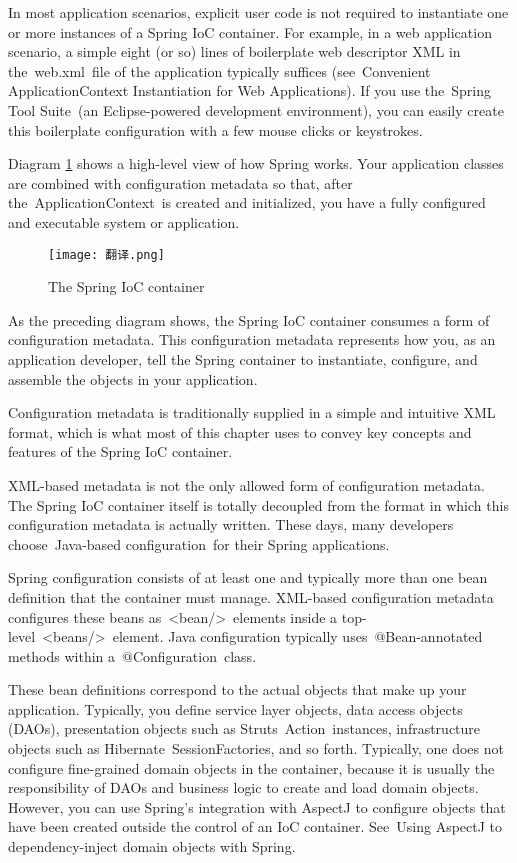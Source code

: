 In most application scenarios, explicit user code is not required to instantiate one or more instances of a Spring IoC container. For example, in a web application scenario, a simple eight (or so) lines of boilerplate web descriptor XML in the web.xml file of the application typically suffices (see Convenient ApplicationContext Instantiation for Web Applications). If you use the Spring Tool Suite (an Eclipse-powered development environment), you can easily create this boilerplate configuration with a few mouse clicks or keystrokes.

Diagram \ref{fig:spring-di-en} shows a high-level view of how Spring works. Your application classes are combined with configuration metadata so that, after the ApplicationContext is created and initialized, you have a fully configured and executable system or application.

\begin{figure}[!ht]
  \centering
  \texttt{[image: 翻译.png]}
  \caption{The Spring IoC container}
  \label{fig:spring-di-en}
\end{figure}

As the preceding diagram shows, the Spring IoC container consumes a form of configuration metadata. This configuration metadata represents how you, as an application developer, tell the Spring container to instantiate, configure, and assemble the objects in your application.

Configuration metadata is traditionally supplied in a simple and intuitive XML format, which is what most of this chapter uses to convey key concepts and features of the Spring IoC container.

XML-based metadata is not the only allowed form of configuration metadata. The Spring IoC container itself is totally decoupled from the format in which this configuration metadata is actually written. These days, many developers choose Java-based configuration for their Spring applications.

Spring configuration consists of at least one and typically more than one bean definition that the container must manage. XML-based configuration metadata configures these beans as <bean/> elements inside a top-level <beans/> element. Java configuration typically uses @Bean-annotated methods within a @Configuration class.

These bean definitions correspond to the actual objects that make up your application. Typically, you define service layer objects, data access objects (DAOs), presentation objects such as Struts Action instances, infrastructure objects such as Hibernate SessionFactories, and so forth. Typically, one does not configure fine-grained domain objects in the container, because it is usually the responsibility of DAOs and business logic to create and load domain objects. However, you can use Spring’s integration with AspectJ to configure objects that have been created outside the control of an IoC container. See Using AspectJ to dependency-inject domain objects with Spring.

